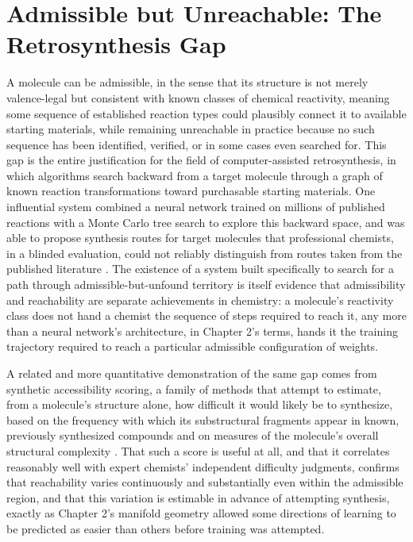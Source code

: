 \documentclass[11pt]{book}
\begin{document}
\section{Admissible but Unreachable: The Retrosynthesis Gap}

A molecule can be admissible, in the sense that its structure is not merely valence-legal but consistent with known classes of chemical reactivity, meaning some sequence of established reaction types could plausibly connect it to available starting materials, while remaining unreachable in practice because no such sequence has been identified, verified, or in some cases even searched for. This gap is the entire justification for the field of computer-assisted retrosynthesis, in which algorithms search backward from a target molecule through a graph of known reaction transformations toward purchasable starting materials. One influential system combined a neural network trained on millions of published reactions with a Monte Carlo tree search to explore this backward space, and was able to propose synthesis routes for target molecules that professional chemists, in a blinded evaluation, could not reliably distinguish from routes taken from the published literature \cite{segler2018}. The existence of a system built specifically to search for a path through admissible-but-unfound territory is itself evidence that admissibility and reachability are separate achievements in chemistry: a molecule's reactivity class does not hand a chemist the sequence of steps required to reach it, any more than a neural network's architecture, in Chapter 2's terms, hands it the training trajectory required to reach a particular admissible configuration of weights.

A related and more quantitative demonstration of the same gap comes from synthetic accessibility scoring, a family of methods that attempt to estimate, from a molecule's structure alone, how difficult it would likely be to synthesize, based on the frequency with which its substructural fragments appear in known, previously synthesized compounds and on measures of the molecule's overall structural complexity \cite{ertl2009}. That such a score is useful at all, and that it correlates reasonably well with expert chemists' independent difficulty judgments, confirms that reachability varies continuously and substantially even within the admissible region, and that this variation is estimable in advance of attempting synthesis, exactly as Chapter 2's manifold geometry allowed some directions of learning to be predicted as easier than others before training was attempted.
\end{document}
